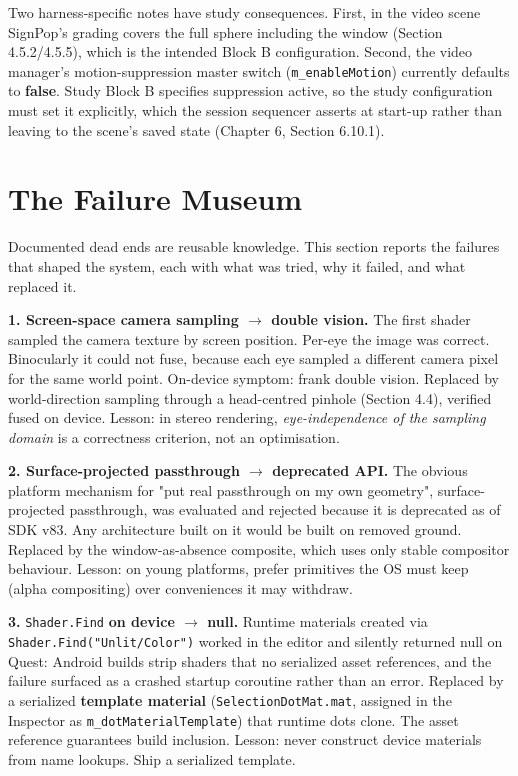 Two harness-specific notes have study consequences. First, in the video scene SignPop's grading
covers the full sphere including the window (Section 4.5.2/4.5.5), which is the intended Block B
configuration. Second, the video manager's motion-suppression master switch (\verb|m_enableMotion|)
currently defaults to \textbf{false}. Study Block B specifies suppression active, so the study
configuration must set it explicitly, which the session sequencer asserts at start-up rather than
leaving to the scene's saved state (Chapter 6, Section 6.10.1).

\section{The Failure Museum}

Documented dead ends are reusable knowledge. This section reports the failures that shaped the system,
each with what was tried, why it failed, and what replaced it.

\textbf{1. Screen-space camera sampling $\rightarrow$ double vision.} The first shader sampled the camera texture by
screen position. Per-eye the image was correct. Binocularly it could not fuse, because each eye
sampled a different camera pixel for the same world point. On-device symptom: frank double vision.
Replaced by world-direction sampling through a head-centred pinhole (Section 4.4), verified fused on
device. Lesson: in stereo rendering, \textit{eye-independence of the sampling domain} is a correctness
criterion, not an optimisation.

\textbf{2. Surface-projected passthrough $\rightarrow$ deprecated API.} The obvious platform mechanism for "put real
passthrough on my own geometry", surface-projected passthrough, was evaluated and rejected because
it is deprecated as of SDK v83. Any architecture built on it would be built on removed ground.
Replaced by the window-as-absence composite, which uses only stable compositor behaviour. Lesson: on
young platforms, prefer primitives the OS must keep (alpha compositing) over conveniences it may
withdraw.

\textbf{3. }\verb|Shader.Find|\textbf{ on device $\rightarrow$ null.} Runtime materials created via \verb|Shader.Find("Unlit/Color")|
worked in the editor and silently returned null on Quest: Android builds strip shaders that no
serialized asset references, and the failure surfaced as a crashed startup coroutine rather than an
error. Replaced by a serialized \textbf{template material} (\verb|SelectionDotMat.mat|, assigned in the
Inspector as \verb|m_dotMaterialTemplate|) that runtime dots clone. The asset reference guarantees build
inclusion. Lesson: never construct device materials from name lookups. Ship a serialized template.

